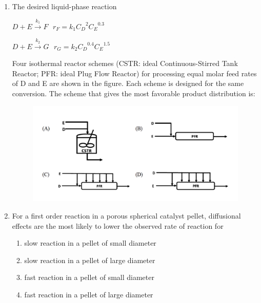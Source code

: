 \documentclass[journal,12pt,onecolumn]{IEEEtran}
\theoremstyle{remark}
\begin{document}
\begin{enumerate}
    \item  The desired liquid-phase reaction

    

     $D + E \overset{k_1}{\to} F \hspace{8pt} r_F = k_1 {C_D}^{2} {C_E}^{0.3}$ 

   
        
            $D + E \overset{k_2}{\to} G \hspace{8pt} r_G = k_2 {C_D}^{0.4} {C_E}^{1.5}$
    
        
Four isothermal reactor schemes (CSTR: ideal Continuous-Stirred Tank Reactor; PFR: ideal Plug Flow Reactor) for processing equal molar feed rates of D and E are shown in the figure. Each scheme is designed for the same conversion. The scheme that gives the most favorable product distribution is:

 \hfill{}
\begin{figure}[H]
    \centering
    \includegraphics[width=1\linewidth]{Fig/10.png}
    \caption{}
    \label{fig:10}
\end{figure}

    \item For a first order reaction in a porous spherical catalyst pellet, diffusional effects are the most likely to lower the observed rate of reaction for
    
 \hfill{}
\begin{enumerate}
    \item slow reaction in a pellet of small diameter
    \item slow reaction in a pellet of large diameter
    \item fast reaction in a pellet of small diameter
    \item fast reaction in a pellet of large diameter
\end{enumerate}


\end{enumerate}
\end{document}
